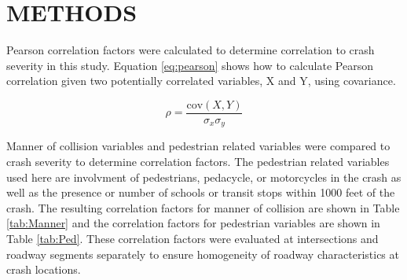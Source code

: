 \documentclass[3p, authoryear]{elsarticle} %
\begin{document}
\hypertarget{methods}{%
\section{METHODS}\label{methods}}

Pearson correlation factors were calculated to determine correlation to crash severity in this study. Equation \eqref{eq:pearson} shows how to calculate Pearson correlation given two potentially correlated variables, X and Y, using covariance.

\begin{equation}
  \rho = \frac{\text{cov}(X,Y)}{\sigma_x \sigma_y}
  \label{eq:pearson}
\end{equation}

Manner of collision variables and pedestrian related variables were compared to crash severity to determine correlation factors. The pedestrian related variables used here are involvment of pedestrians, pedacycle, or motorcycles in the crash as well as the presence or number of schools or transit stops within 1000 feet of the crash. The resulting correlation factors for manner of collision are shown in Table \ref{tab:Manner} and the correlation factors for pedestrian variables are shown in Table \ref{tab:Ped}. These correlation factors were evaluated at intersections and roadway segments separately to ensure homogeneity of roadway characteristics at crash locations.
\end{document}
